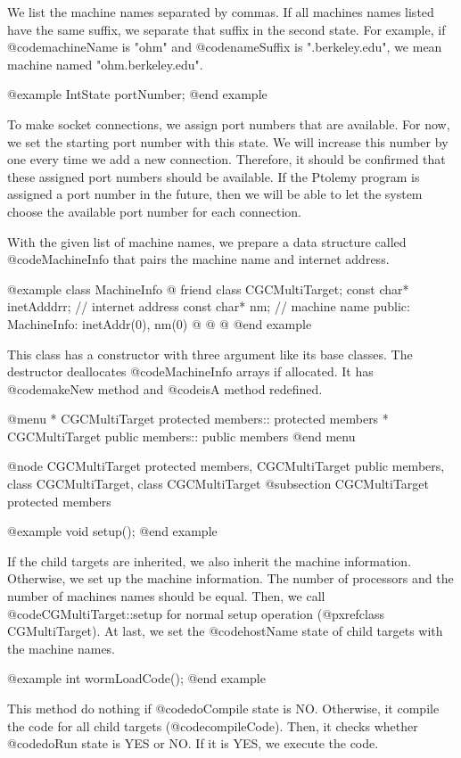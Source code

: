 {We list the machine names separated by commas. If all machines names listed
have the same suffix, we separate that suffix in the second state. For
example, if @code{machineName} is "ohm" and @code{nameSuffix} 
is ".berkeley.edu", we mean machine named "ohm.berkeley.edu".

@example
IntState portNumber;
@end example

To make socket connections, we assign port numbers that are available.
For now, we set the starting port number with this state. We will
increase this number by one every time we add a new connection. Therefore,
it should be confirmed that these assigned port numbers should be available.
If the Ptolemy program is assigned a port number in the future, then we will
be able to let the system choose the available port number for each
connection.

With the given list of machine names, we prepare a data structure called
@code{MachineInfo} that pairs the machine name and internet address.

@example
class MachineInfo @{
friend class CGCMultiTarget;
	const char* inetAdddrr;		// internet address
	const char* nm;			// machine name
public:
	MachineInfo: inetAddr(0), nm(0) @{ @}
@}
@end example

This class has a constructor with three argument like its base classes. The
destructor deallocates @code{MachineInfo} arrays if allocated. It has
@code{makeNew} method and @code{isA} method redefined.

@menu
* CGCMultiTarget protected members::		protected members
* CGCMultiTarget public members::		public members
@end menu

@node CGCMultiTarget protected members, CGCMultiTarget public members, class CGCMultiTarget, class CGCMultiTarget
@subsection CGCMultiTarget protected members

@example
void setup();
@end example

If the child targets are inherited, we also inherit the machine information.
Otherwise, we set up the machine information. The number of processors and
the number of machines names should be equal. Then, we call
@code{CGMultiTarget::setup} for normal setup operation 
(@pxref{class CGMultiTarget}). At last, we set the @code{hostName} state
of child targets with the machine names.

@example
int wormLoadCode();
@end example

This method do nothing if @code{doCompile} state is NO. Otherwise, it
compile the code for all child targets (@code{compileCode}). Then, it
checks whether @code{doRun} state is YES or NO. If it is YES, we execute
the code.

}
